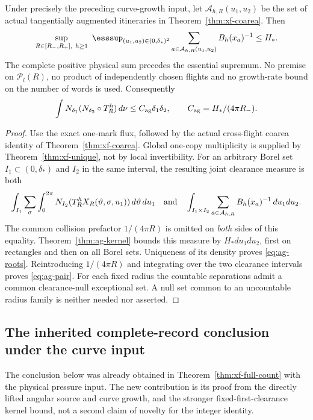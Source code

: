 \begin{theorem}
\label{thm:ag-roots}
Under precisely the preceding curve-growth input, let
$\mathcal A_{h,R}(u_1,u_2)$ be the set of actual tangentially
augmented itineraries in Theorem~\ref{thm:xf-coarea}. Then
\begin{equation}\label{eq:ag-roots}
 \sup_{R\in[R_-,R_+],\ h\ge1}\ 
 \esssup_{(u_1,u_2)\in(0,\delta_*)^2}
       \sum_{a\in\mathcal A_{h,R}(u_1,u_2)}B_h(x_a)^{-1}
                  \le H_*.
\end{equation}
The complete positive physical sum precedes the essential supremum.
No premise on $\mathcal P_l(R)$, no product of independently chosen
flights and no growth-rate bound on the number of words is used.
Consequently
\begin{equation}\label{eq:ag-pair}
 \int N_{\delta_1}(N_{\delta_2}\circ T_R^h)\,d\nu
       \le C_{\rm ag}\delta_1\delta_2,
       \qquad C_{\rm ag}=H_*/(4\pi R_-).
\end{equation}
\end{theorem}
\begin{proof}
Use the exact one-mark flux, followed by the actual
cross-flight coarea identity of Theorem~\ref{thm:xf-coarea}.
Global one-copy multiplicity is supplied by
Theorem~\ref{thm:xf-unique}, not by local invertibility. For an
arbitrary Borel set $I_1\subset(0,\delta_*)$ and $I_2$ in the
same interval, the resulting joint clearance measure is both
\[
 \int_{I_1}\sum_{\sigma}\int_0^{2\pi}
 N_{I_2}(T_R^hX_R(\vartheta,\sigma,u_1))\,d\vartheta\,du_1
 \quad\hbox{and}\quad
 \int_{I_1\times I_2}\sum_{a\in\mathcal A_{h,R}}B_h(x_a)^{-1}
                                                    \,du_1du_2.
\]
The common collision prefactor $1/(4\pi R)$ is omitted on
\emph{both} sides of this equality. Theorem~\ref{thm:ag-kernel}
bounds this measure by $H_*du_1du_2$, first on rectangles and
then on all Borel sets. Uniqueness of its density proves
\eqref{eq:ag-roots}. Reintroducing $1/(4\pi R)$ and integrating
over the two clearance intervals proves \eqref{eq:ag-pair}.
For each fixed radius the countable separations admit a common
clearance-null exceptional set. A null set common to an uncountable
radius family is neither needed nor asserted.
\end{proof}

\subsection{The inherited complete-record conclusion under the curve input}
The conclusion below was already obtained in
Theorem~\ref{thm:xf-full-count} with the physical pressure input.
The new contribution is its proof from the directly lifted angular
source and curve growth, and the stronger fixed-first-clearance
kernel bound, not a second claim of novelty for the integer identity.

